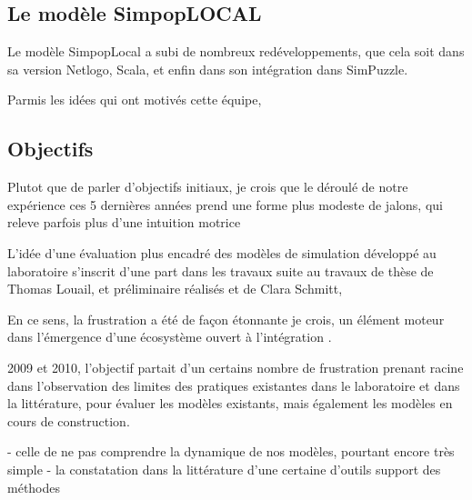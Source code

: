 
%

%


\subsection{Le modèle SimpopLOCAL}

Le modèle SimpopLocal a subi de nombreux redéveloppements, que cela soit dans sa version Netlogo, Scala, et enfin dans son intégration dans SimPuzzle.

Parmis les idées qui ont motivés cette équipe,

\subsection{Objectifs}

Plutot que de parler d'objectifs initiaux, je crois que le déroulé de notre expérience ces 5 dernières années prend une forme plus modeste de jalons, qui releve parfois plus d'une intuition motrice

L'idée d'une évaluation plus encadré des modèles de simulation développé au laboratoire s'inscrit d'une part dans les travaux  suite au travaux de thèse de Thomas Louail, et  préliminaire réalisés et de Clara Schmitt,

En ce sens, la frustration a été de façon étonnante je crois, un élément moteur dans l'émergence d'une écosystème ouvert à l'intégration  .

 2009 et 2010, l'objectif partait d'un certains nombre de frustration prenant racine  dans l'observation des limites des pratiques existantes dans le laboratoire et dans la littérature, pour évaluer les modèles existants, mais également les modèles en cours de construction.

  - celle de ne pas comprendre la dynamique de nos modèles, pourtant encore très simple
  - la constatation dans la littérature d'une certaine d'outils support des méthodes

